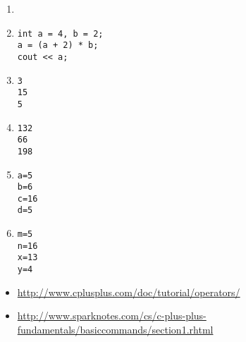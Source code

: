 \begin{enumerate}
\item {}

\item

\noindent\begin{minipage}{\linewidth}\begin{lstlisting}
int a = 4, b = 2;
a = (a + 2) * b;
cout << a;
\end{lstlisting}\end{minipage}

\item 

\noindent\begin{minipage}{\linewidth}\begin{lstlisting}
3
15
5
\end{lstlisting}\end{minipage}

\item

\noindent\begin{minipage}{\linewidth}\begin{lstlisting}
132
66
198
\end{lstlisting}\end{minipage}

\item

\noindent\begin{minipage}{\linewidth}\begin{lstlisting}
a=5
b=6
c=16
d=5
\end{lstlisting}\end{minipage}

\item

\noindent\begin{minipage}{\linewidth}\begin{lstlisting}
m=5
n=16
x=13
y=4
\end{lstlisting}\end{minipage}
\end{enumerate}

\begin{itemize}
\item \url{http://www.cplusplus.com/doc/tutorial/operators/}
\item \url{http://www.sparknotes.com/cs/c-plus-plus-fundamentals/basiccommands/section1.rhtml}
\end{itemize}